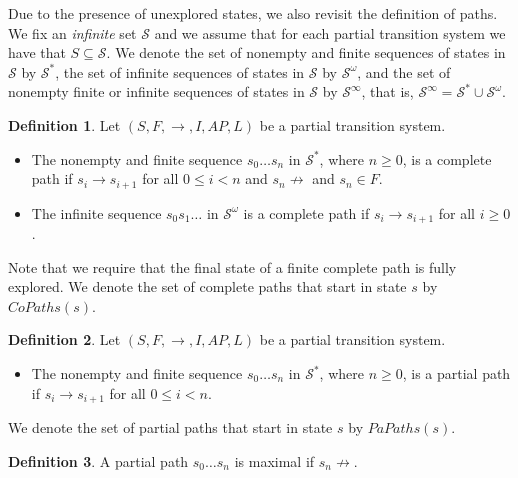 \documentclass[12pt]{article}
\theoremstyle{definition}
\newtheorem{definition}{Definition}
\newenvironment{franck}{\color{red}}{\color{black}}
\begin{document}
Due to the presence of unexplored states, we also revisit the definition of paths.  We fix an \emph{infinite} set $\mathcal{S}$ and we assume that for each partial transition system we have that $S \subseteq \mathcal{S}$.  We denote the set of nonempty and finite sequences of states in $\mathcal{S}$ by $\mathcal{S}^*$, the set of infinite sequences of states in $\mathcal{S}$ by $\mathcal{S}^{\omega}$, and the set of nonempty finite or infinite sequences of states in $\mathcal{S}$ by $\mathcal{S}^{\infty}$, that is, $\mathcal{S}^{\infty} = \mathcal{S}^* \cup \mathcal{S}^{\omega}$.

\begin{definition}
\label{definition:complete-path}
Let $(S, F, \rightarrow, I, \mathit{AP}, L)$ be a partial transition system.
\begin{itemize}
\item 
The nonempty and finite sequence $s_0 \ldots s_n$ in $\mathcal{S}^*$, where $n \geq 0$, is a complete path if $s_i \rightarrow s_{i+1}$ for all $0 \leq i < n$ and $s_n \not\rightarrow$ and $s_n \in F$.
\item 
The infinite sequence $s_0 s_1 \ldots$ in $\mathcal{S}^{\omega}$ is a complete path if $s_i \rightarrow s_{i+1}$ for all $i \geq 0$. 
\end{itemize}
\end{definition}

Note that we require that the final state of a finite complete path is fully explored.  We denote the set of complete paths that start in state $s$ by $\mathit{CoPaths}(s)$.

\begin{definition}
\label{definition:partial-path}
Let $(S, F, \rightarrow, I, \mathit{AP}, L)$ be a partial transition system.
\begin{itemize}
\item 
The nonempty and finite sequence $s_0 \ldots s_n$ in $\mathcal{S}^*$, where $n \geq 0$, is a partial path if $s_i \rightarrow s_{i+1}$ for all $0 \leq i < n$.
\end{itemize}
\end{definition}

We denote the set of partial paths that start in state $s$ by $\mathit{PaPaths}(s)$.

\begin{franck}
\begin{definition}
A partial path $s_0 \ldots s_n$ is maximal if $s_n \not\rightarrow$.
\end{definition}
\end{franck}
\end{document}
